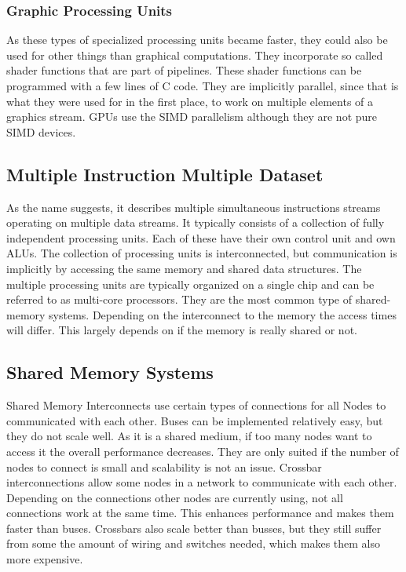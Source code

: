 \documentclass{article}
\begin{document}
	\subsubsection{Graphic Processing Units} %
	\label{ssub:graphic_processing_units}
	As these types of specialized processing units became faster,
	they could also be used for other things than graphical computations.
	They incorporate so called shader functions that are part of pipelines.
	These shader functions can be programmed with a few lines of C code.
	They are implicitly parallel, since that is what they were used for in the first place,
	to work on multiple elements of a graphics stream.
	GPUs use the SIMD parallelism although they are not pure SIMD devices.

\subsection{Multiple Instruction Multiple Dataset} %
\label{sub:multiple_instruction_multiple_dataset}
As the name suggests,
it describes multiple simultaneous instructions streams operating on multiple data streams.
It typically consists of a collection of fully independent processing units.
Each of these have their own control unit and own ALUs.
The collection of processing units is interconnected,
but communication is implicitly by accessing the same memory and shared data structures.
The multiple processing units are typically organized on a single chip
and can be referred to as multi-core processors.
They are the most common type of shared-memory systems.
Depending on the interconnect to the memory the access times will differ. 
This largely depends on if the memory is really shared or not.

\subsection{Shared Memory Systems} %
\label{sub:shared_memory_systems}
Shared Memory Interconnects use certain types of connections
for all Nodes to communicated with each other. 
Buses can be implemented relatively easy,
but they do not scale well.
As it is a shared medium,
if too many nodes want to access it the overall performance decreases.
They are only suited if the number of nodes to connect is small and scalability is not an issue.
Crossbar interconnections allow some nodes in a network to communicate with each other.
Depending on the connections other nodes are currently using,
not all connections work at the same time.
This enhances performance and makes them faster than buses.
Crossbars also scale better than busses,
but they still suffer from some the amount of wiring and switches needed,
which makes them also more expensive.
\end{document}
